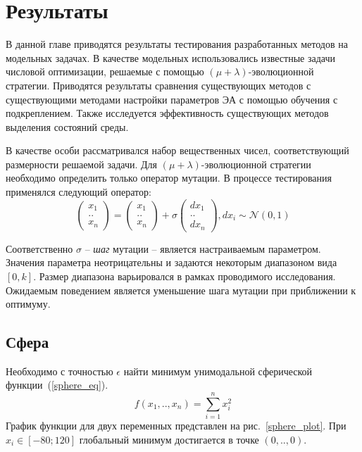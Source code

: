 \chapter{Результаты}
\label{chapter_results}

В данной главе приводятся результаты тестирования разработанных методов на модельных задачах. В качестве модельных использовались известные задачи числовой оптимизации, решаемые с помощью $(\mu + \lambda)$-эволюционной стратегии. Приводятся результаты сравнения существующих методов с существующими методами настройки параметров ЭА с помощью обучения с подкреплением. Также исследуется эффективность существующих методов выделения состояний среды.

В качестве особи рассматривался набор вещественных чисел, соответствующий размерности решаемой задачи. Для $(\mu + \lambda)$-эволюционной стратегии необходимо определить только оператор мутации. В процессе тестирования применялся следующий оператор:
\begin{equation}
 \begin{pmatrix} x_1 \\ .. \\ x_n \end{pmatrix} = \begin{pmatrix} x_1 \\ .. \\ x_n \end{pmatrix} + \sigma \begin{pmatrix}dx_1 \\ .. \\ dx_n\end{pmatrix}, dx_i \sim \mathcal{N}(0, 1)
\end{equation}

Соответственно $\sigma$ -- \textit{шаг} мутации -- является настраиваемым параметром. Значения параметра неотрицательны и задаются некоторым диапазоном вида $[0, k]$. Размер диапазона варьировался в рамках проводимого исследования. Ожидаемым поведением является уменьшение шага мутации при приближении к оптимуму.

\section{Сфера}

Необходимо с точностью $\epsilon$ найти минимум унимодальной сферической функции~(\ref{sphere_eq}).
\begin{equation}
\label{sphere_eq}
f(x_1,..,x_n) = \sum\limits_{i=1}^n{x_i^2}
\end{equation}
График функции для двух переменных представлен на рис.~\ref{sphere_plot}. При $x_i \in [-80; 120]$ глобальный минимум достигается в точке $(0,..,0)$.

